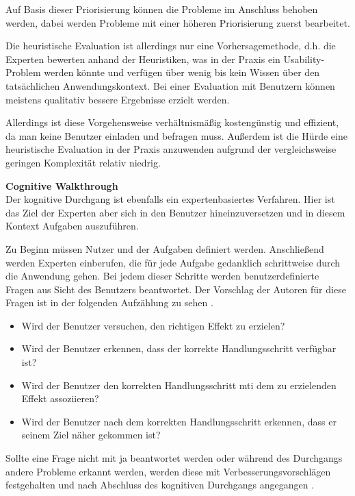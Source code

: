 \documentclass[utf8,biblatex]{lni}
\begin{document}
Auf Basis dieser Priorisierung können die Probleme im Anschluss behoben werden, dabei werden Probleme mit einer höheren Priorisierung zuerst bearbeitet.

Die heuristische Evaluation ist allerdings nur eine Vorhersagemethode, d.h. die Experten bewerten anhand der Heuristiken, was in der Praxis ein Usability-Problem werden könnte und verfügen über wenig bis kein Wissen über den tatsächlichen Anwendungskontext. Bei einer Evaluation mit Benutzern können meistens qualitativ bessere Ergebnisse erzielt werden. 

Allerdings ist diese Vorgehensweise verhältnismäßig kostengünstig und effizient, da man keine Benutzer einladen und befragen muss. Außerdem ist die Hürde eine heuristische Evaluation in der Praxis anzuwenden aufgrund der vergleichsweise geringen Komplexität relativ niedrig. 

\textbf{Cognitive Walkthrough}\\
Der kognitive Durchgang ist ebenfalls ein expertenbasiertes Verfahren. Hier ist das Ziel der Experten aber sich in den Benutzer hineinzuversetzen und in diesem Kontext Aufgaben auszuführen. 

Zu Beginn müssen Nutzer und der Aufgaben definiert werden. Anschließend werden Experten einberufen, die für jede Aufgabe gedanklich schrittweise durch die Anwendung gehen. Bei jedem dieser Schritte werden benutzerdefinierte Fragen aus Sicht des Benutzers beantwortet. Der Vorschlag der Autoren für diese Fragen ist in der folgenden Aufzählung zu sehen \cite[112]{Nielsen.1994b}.

\begin{itemize}
  \item Wird der Benutzer versuchen, den richtigen Effekt zu erzielen?
  \item Wird der Benutzer erkennen, dass der korrekte Handlungsschritt verfügbar ist?
  \item Wird der Benutzer den korrekten Handlungsschritt mti dem zu erzielenden Effekt assoziieren?
  \item Wird der Benutzer nach dem korrekten Handlungsschritt erkennen, dass er seinem Ziel näher gekommen ist?
\end{itemize}

Sollte eine Frage nicht mit \glqq ja\grqq{} beantwortet werden oder während des Durchgangs andere Probleme erkannt werden, werden diese mit Verbesserungsvorschlägen festgehalten und nach Abschluss des kognitiven Durchgangs angegangen \cite[vgl.][106]{Nielsen.1994b}. 
\end{document}
